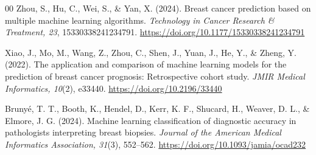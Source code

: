 \documentclass[conference]{IEEEtran}
\begin{document}
\begin{thebibliography}{00}
 Zhou, S., Hu, C., Wei, S., \& Yan, X. (2024). Breast cancer prediction based on multiple machine learning algorithms. \textit{Technology in Cancer Research \& Treatment, 23}, 15330338241234791. \url{https://doi.org/10.1177/15330338241234791}

 Xiao, J., Mo, M., Wang, Z., Zhou, C., Shen, J., Yuan, J., He, Y., \& Zheng, Y. (2022). The application and comparison of machine learning models for the prediction of breast cancer prognosis: Retrospective cohort study. \textit{JMIR Medical Informatics, 10}(2), e33440. \url{https://doi.org/10.2196/33440}

 Bruny\'e, T. T., Booth, K., Hendel, D., Kerr, K. F., Shucard, H., Weaver, D. L., \& Elmore, J. G. (2024). Machine learning classification of diagnostic accuracy in pathologists interpreting breast biopsies. \textit{Journal of the American Medical Informatics Association, 31}(3), 552--562. \url{https://doi.org/10.1093/jamia/ocad232}

\end{thebibliography}
\end{document}

